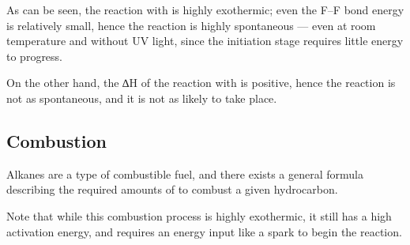 				As can be seen, the reaction with  is highly exothermic; even the F–F bond energy is relatively small, hence the
				reaction is highly spontaneous --- even at room temperature and without UV light, since the initiation stage requires
				little energy to progress.

				On the other hand, the ∆H of the reaction with  is positive, hence the reaction is not as spontaneous, and it is not
				as likely to take place.



		\pagebreak
		\subsection{Combustion}

			Alkanes are a type of combustible fuel, and there exists a general formula describing the required amounts of 
			to combust a given hydrocarbon.


			Note that while this combustion process is highly exothermic, it still has a high activation energy, and requires an energy
			input like a spark to begin the reaction.


















